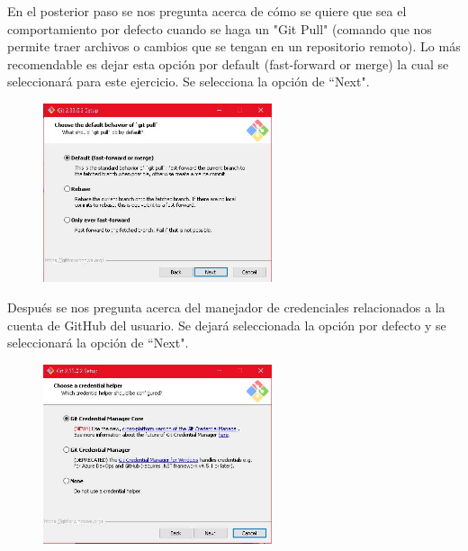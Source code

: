 \documentclass[10pt,a4paper]{article} %
\begin{document}
\begin{enumerate}
{			\pagebreak
			\item En el posterior paso se nos pregunta acerca de c{\' o}mo se quiere que sea el comportamiento por defecto cuando se haga un "Git Pull" (comando que nos permite traer archivos o cambios que se tengan en un repositorio remoto). Lo m{\' a}s recomendable es dejar esta opci{\' o}n por default (fast-forward or merge) la cual se seleccionar{\' a} para este ejercicio. Se selecciona la opci{\' o}n de ``Next".
			\begin{figure}[H]
				\includegraphics[width=0.6\textwidth]{15.jpg}
				\centering
				\label{img:paso15}
			\end{figure}
			\item Despu{\' e}s se nos pregunta acerca del manejador de credenciales relacionados a la cuenta de GitHub del usuario. Se dejar{\' a} seleccionada la opci{\' o}n por defecto y se seleccionar{\' a} la opci{\' o}n de ``Next".
			\begin{figure}[H]
				\includegraphics[width=0.6\textwidth]{16.jpg}
				\centering
				\label{img:paso16}
			\end{figure}
			
}
\end{enumerate}
\end{document}

